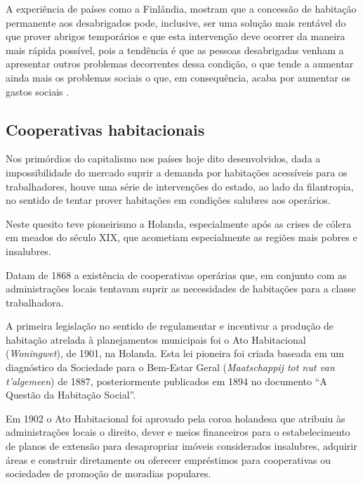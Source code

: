 \documentclass[
	12pt,				%
	oneside,			%
	a4paper,			%
	chapter=TITLE,		%
	section=TITLE,		%
	english,			%
	brazil				%
	]{abntex2}
\begin{document}
A experiência de países como a Finlândia, mostram que a concessão
de habitação permanente aos desabrigados pode, inclusive, ser uma solução mais
rentável do que prover abrigos temporários e que esta intervenção deve ocorrer
da maneira mais rápida possível, pois a tendência é que as pessoas desabrigadas
venham a apresentar outros problemas decorrentes dessa condição, o que tende
a aumentar ainda mais os problemas sociais o que, em consequência, acaba por
aumentar os gastos sociais \autocite{finlandia}.

\hypertarget{cooperativas-habitacionais}{%
\subsection{Cooperativas habitacionais}\label{cooperativas-habitacionais}}

Nos primórdios do capitalismo nos países hoje dito desenvolvidos, dada a
impossibilidade do mercado suprir a demanda por habitações acessíveis para os
trabalhadores, houve uma série de intervenções do estado, ao lado da filantropia,
no sentido de tentar prover habitações em condições salubres aos operários.

Neste quesito teve pioneirismo a Holanda, especialmente após as crises de cólera
em meados do século XIX, que acometiam especialmente as regiões mais pobres e
insalubres.

Datam de 1868 a existência de cooperativas operárias que, em conjunto com as
administrações locais tentavam suprir as necessidades de habitações para a
classe trabalhadora.

A primeira legislação no sentido de regulamentar e incentivar a produção de
habitação atrelada à planejamentos municipais foi o Ato Habitacional
(\emph{Woningwet}), de 1901, na Holanda. Esta lei pioneira foi criada baseada em um
diagnóstico da Sociedade para o Bem-Estar Geral
(\emph{Maatschappij tot nut van t'algemeen}) de 1887, posteriormente publicados em
1894 no documento ``A Questão da Habitação Social''.

Em 1902 o Ato Habitacional foi aprovado pela coroa holandesa que atribuiu às
administrações locais o direito, dever e meios financeiros para o
estabelecimento de planos de extensão para desapropriar imóveis considerados
insalubres, adquirir áreas e construir diretamente ou oferecer empréstimos para
cooperativas ou sociedades de promoção de moradias populares.
\end{document}
